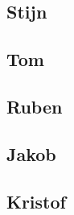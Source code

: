 \documentclass[11pt, a4paper]{article}
\begin{document}
\subsection{Stijn}
\subsection{Tom}
\subsection{Ruben}
\subsection{Jakob}
\subsection{Kristof}
\end{document}
